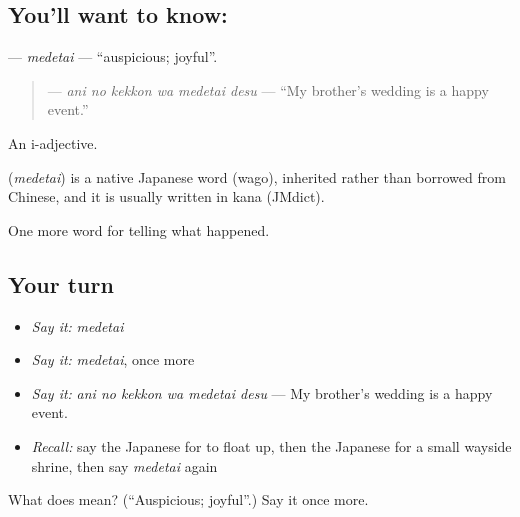 \subsection*{You'll want to know: }
\textbf{} — \emph{medetai} — \textquotedblleft{}auspicious; joyful\textquotedblright{}.

\begin{quote}
\textbf{  } — \emph{ani no kekkon wa medetai desu} — \textquotedblleft{}My brother's wedding is a happy event.\textquotedblright{}
\end{quote}

An i-adjective.

\begin{cousinweb}
\textbf{} (\emph{medetai}) is a native Japanese word (wago), inherited rather than borrowed from Chinese, and it is usually written in kana (JMdict).
\end{cousinweb}

\begin{grammarlens}[title={What you've built}]
One more word for telling what happened.
\end{grammarlens}

\subsection*{Your turn}
\begin{itemize}
\raggedright
  \item \emph{Say it:} \emph{medetai}
  \item \emph{Say it:} \emph{medetai}, once more
  \item \emph{Say it:} \emph{ani no kekkon wa medetai desu} — My brother's wedding is a happy event.
  \item \emph{Recall:} say the Japanese for to float up, then the Japanese for a small wayside shrine, then say \emph{medetai} again
\end{itemize}

\begin{tcolorbox}[breakable,colback=teal!4,colframe=teal!35!black,title={Before you move on}]
What does  mean? (\textquotedblleft{}Auspicious; joyful\textquotedblright{}.) Say it once more.
\end{tcolorbox}
